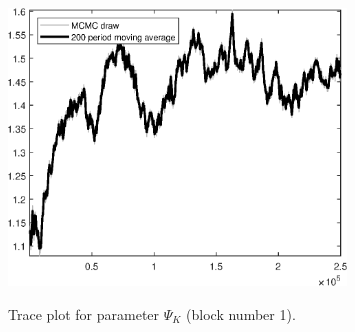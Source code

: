 \begin{figure}[H]
\centering
  \includegraphics[width=0.8\textwidth]{BRS_extended_fd/graphs/TracePlot_Psi_K_blck_1}\\
    \caption{Trace plot for parameter ${\Psi_K}$ (block number 1).}
\end{figure}
